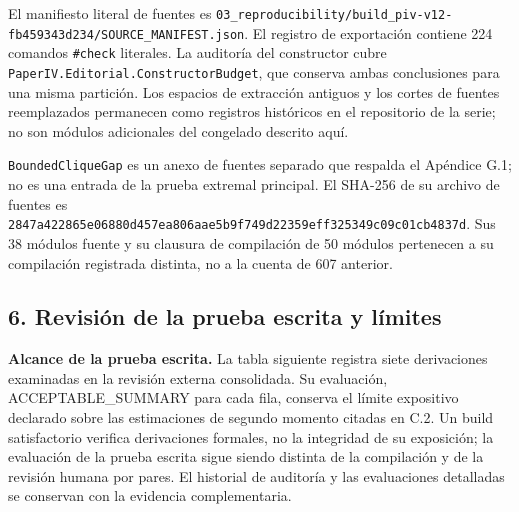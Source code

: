 \documentclass[spanish,11pt,a4paper]{article}
\begin{document}
El manifiesto literal de fuentes es
\nolinkurl{03_reproducibility/build_piv-v12-fb459343d234/SOURCE_MANIFEST.json}.
El registro de exportación contiene 224 comandos \nolinkurl{#check}
literales. La auditoría del constructor cubre
\nolinkurl{PaperIV.Editorial.ConstructorBudget}, que conserva ambas
conclusiones para una misma partición. Los espacios de extracción
antiguos y los cortes de fuentes reemplazados permanecen como registros
históricos en el repositorio de la serie; no son módulos adicionales del
congelado descrito aquí.

\nolinkurl{BoundedCliqueGap} es un anexo de fuentes separado que respalda
el Apéndice G.1; no es una entrada de la prueba extremal principal. El
SHA-256 de su archivo de fuentes es
\nolinkurl{2847a422865e06880d457ea806aae5b9f749d22359eff325349c09c01cb4837d}.
Sus 38 módulos fuente y su clausura de compilación de 50 módulos
pertenecen a su compilación registrada distinta, no a la cuenta de 607
anterior.

\subsection{6. Revisión de la prueba escrita y
límites}\label{revisiuxf3n-de-la-prueba-escrita-y-luxedmites}

\textbf{Alcance de la prueba escrita.} La tabla siguiente registra siete
derivaciones examinadas en la revisión externa consolidada. Su
evaluación, ACCEPTABLE\_SUMMARY para cada fila, conserva el límite
expositivo declarado sobre las estimaciones de segundo momento citadas
en C.2. Un build satisfactorio verifica derivaciones formales, no la
integridad de su exposición; la evaluación de la prueba escrita sigue
siendo distinta de la compilación y de la revisión humana por pares. El
historial de auditoría y las evaluaciones detalladas se conservan con la
evidencia complementaria.
\end{document}
